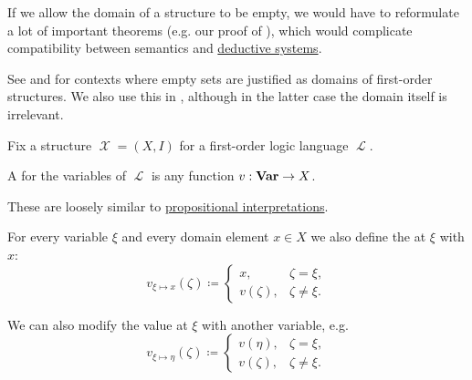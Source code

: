 \begin{remark}\label{rem:empty_first_order_structures}
   If we allow the domain of a structure to be empty, we would have to reformulate a lot of important theorems (e.g. our proof of ), which would complicate compatibility between semantics and \hyperref[def:deductive_system]{deductive systems}.

   See  and  for contexts where empty sets are justified as domains of first-order structures. We also use this in , although in the latter case the domain itself is irrelevant.
\end{remark}

\begin{definition}\label{def:first_order_valuation}
  Fix a structure \( \mscrX = (X, I) \) for a first-order logic language \( \mscrL \).

  \begin{thmenum}
     A  for the variables of \( \mscrL \) is any function \( v: \operatorname{\mathbf{Var}} \to X \).

    These are loosely similar to \hyperref[def:propositional_valuation/interpretation]{propositional interpretations}.

     For every variable \( \xi \) and every domain element \( x \in X \) we also define the  at \( \xi \) with \( x \):
    \begin{equation*}
      v_{\xi \mapsto x}(\zeta) \coloneqq \begin{cases}
        x,        &\zeta = \xi, \\
        v(\zeta), &\zeta \neq \xi.
      \end{cases}
    \end{equation*}

    We can also modify the value at \( \xi \) with another variable, e.g.
    \begin{equation*}
      v_{\xi \mapsto \eta}(\zeta) \coloneqq \begin{cases}
        v(\eta),  &\zeta = \xi, \\
        v(\zeta), &\zeta \neq \xi.
      \end{cases}
    \end{equation*}


\end{thmenum}
\end{definition}
